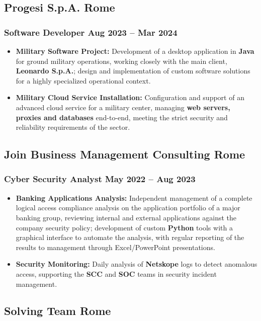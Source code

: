 \documentclass[11pt]{article}
\newcommand{\rside}[1]{
  \hfill {\normalfont\color{accent} #1}%
}
\begin{document}
\subsection{Progesi S.p.A. \rside{Rome}}
\subsubsection{Software Developer \rside{Aug 2023 -- Mar 2024}}
\begin{itemize}
  \item \textbf{Military Software Project:} Development of a desktop application in \textbf{Java} for ground military operations, working closely with the main client, \textbf{Leonardo S.p.A.}; design and implementation of custom software solutions for a highly specialized operational context.
  \item \textbf{Military Cloud Service Installation:} Configuration and support of an advanced cloud service for a military center, managing \textbf{web servers, proxies and databases} end-to-end, meeting the strict security and reliability requirements of the sector.
\end{itemize}

\subsection{Join Business Management Consulting \rside{Rome}}
\subsubsection{Cyber Security Analyst \rside{May 2022 -- Aug 2023}}
\begin{itemize}
  \item \textbf{Banking Applications Analysis:} Independent management of a complete logical access compliance analysis on the application portfolio of a major banking group, reviewing internal and external applications against the company security policy; development of custom \textbf{Python} tools with a graphical interface to automate the analysis, with regular reporting of the results to management through Excel/PowerPoint presentations.
  \item \textbf{Security Monitoring:} Daily analysis of \textbf{Netskope} logs to detect anomalous access, supporting the \textbf{SCC} and \textbf{SOC} teams in security incident management.
\end{itemize}

\subsection{Solving Team \rside{Rome}}
\end{document}
